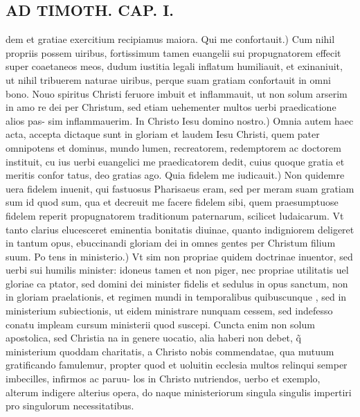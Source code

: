 \documentclass{article}
\begin{document}
\begin{pages}
\section*{AD TIMOTH. CAP. I. }
\marginpar{[ p.473 ]}\pstart dem et gratiae exercitium recipiamus maiora. Qui me confortauit.) Cum nihil propriis possem uiribus, fortissimum tamen euangelii sui propugnatorem effecit super coaetaneos meos, dudum iustitia legali inflatum humiliauit, et exinaniuit, ut nihil tribuerem naturae uiribus, perque suam gratiam confortauit in omni bono. Nouo spiritus Christi feruore imbuit et inflammauit, ut non solum arserim in amo re dei per Christum, sed etiam uehementer multos uerbi praedicatione alios pas- sim inflammauerim. In Christo Iesu domino nostro.) Omnia autem haec acta, accepta dictaque sunt in gloriam et laudem Iesu Christi, quem pater omnipotens et dominus, mundo lumen, recreatorem, redemptorem ac doctorem instituit, cu ius uerbi euangelici me praedicatorem dedit, cuius quoque gratia et meritis confor tatus, deo gratias ago. Quia fidelem me iudicauit.) Non quidemre uera fidelem inuenit, qui fastuosus Pharisaeus eram, sed per meram suam gratiam sum id quod sum, qua et decreuit me facere fidelem sibi, quem praesumptuose fidelem reperit propugnatorem traditionum paternarum, scilicet ludaicarum. Vt tanto clarius elucesceret eminentia bonitatis diuinae, quanto indigniorem deligeret in tantum opus, ebuccinandi gloriam dei in omnes gentes per Christum filium suum. Po tens in ministerio.) Vt sim non propriae quidem doctrinae inuentor, sed uerbi sui humilis minister: idoneus tamen et non piger, nec propriae utilitatis uel gloriae ca ptator, sed domini dei minister fidelis et sedulus in opus sanctum, non in gloriam praelationis, et regimen mundi in temporalibus quibuscunque , sed in ministerium subiectionis, ut eidem ministrare nunquam cessem, sed indefesso conatu impleam cursum ministerii quod suscepi. Cuncta enim non solum apostolica, sed Christia na in genere uocatio, alia haberi non debet, q̃ ministerium quoddam charitatis, a Christo nobis commendatae, qua mutuum gratificando famulemur, propter quod et uoluitin ecclesia multos relinqui semper imbecilles, infirmos ac paruu- los in Christo nutriendos, uerbo et exemplo, alterum indigere alterius opera, do naque ministeriorum singula singulis impertiri pro singulorum necessitatibus.  \pend
{}
{}

\end{pages}
\end{document}
